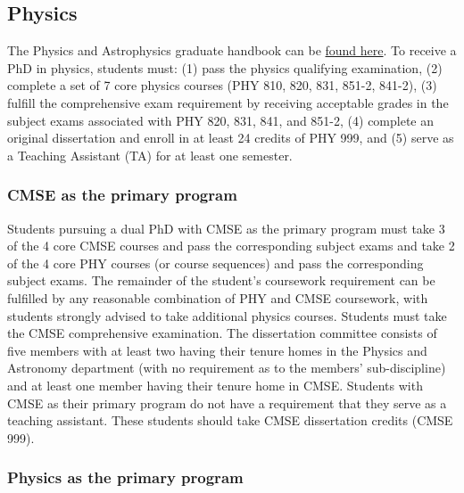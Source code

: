 \subsection{Physics}

The Physics and Astrophysics graduate handbook can be \href{http://www.pa.msu.edu/grad/GradHandbook.pdf}{found
  here}.  
To receive a PhD in physics, students must: (1) pass the physics
qualifying examination, (2) complete a set of 7 core physics courses
(PHY 810, 820, 831, 851-2, 841-2), (3) fulfill the comprehensive exam
requirement by receiving acceptable grades in the subject exams
associated with PHY 820, 831, 841, and 851-2, (4) complete an original
dissertation and enroll in at least 24 credits of PHY 999, and (5)
serve as a Teaching Assistant (TA) for at least one semester.

\subsubsection{CMSE as the primary program}

Students pursuing a dual PhD with CMSE as the primary program must
take 3 of the 4 core CMSE courses and pass the corresponding subject
exams and take 2 of the 4 core PHY courses (or course sequences) and
pass the corresponding subject exams.  The remainder of the student's
coursework requirement can be fulfilled by any reasonable combination
of PHY and CMSE coursework, with students strongly advised to take
additional physics courses.  Students must take the CMSE comprehensive
examination.  The dissertation committee consists of five members with
at least two having their tenure homes in the Physics and Astronomy
department (with no requirement as to the members' sub-discipline) and
at least one member having their tenure home in CMSE.  Students with
CMSE as their primary program do not have a requirement that they
serve as a teaching assistant.  These students should take CMSE
dissertation credits (CMSE 999).

\subsubsection{Physics as the primary program}

